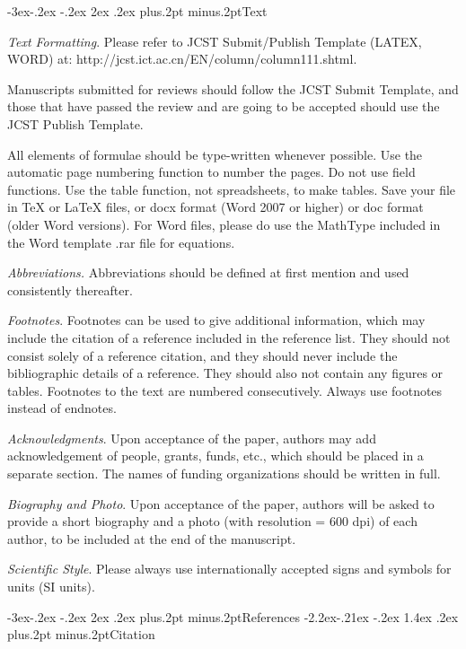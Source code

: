 \documentclass[twoside]{article}
\makeatletter
\def\subsection{\@startsection{subsection}{2}{\z@}%
 {-3ex\@plus -.2ex \@minus -.2ex}%
 {2ex \@plus.2ex}%
{\normalfont\normalsize\protect\baselineskip=12.5pt plus.2pt minus.2pt\bfseries}}
\def\subsubsection{\@startsection{subsubsection}{3}{\z@}%
 {-2.2ex\@plus -.21ex \@minus -.2ex}%
 {1.4ex \@plus.2ex}
{\normalfont\normalsize\protect\baselineskip=12pt plus.2pt minus.2pt\sl}}
\makeatother
\begin{document}
\begin{multicols}{2}
\subsection{Text}

{\it Text Formatting}. Please refer to JCST Submit/Publish Template (LATEX, WORD) at:  http://jc\-st.ict.ac.cn/EN/column/column111.shtml.

Manuscripts submitted for reviews should follow the JCST Submit Template, and those that have passed the review and are going to be accepted should use the JCST Publish Template.

All elements of formulae should be type-written whenever possible. Use the automatic page numbering function to number the pages. Do not use field functions. Use the table function, not spreadsheets, to make tables. Save your file in TeX or LaTeX files, or docx format (Word 2007 or higher) or doc format (older Word versions). For Word files, please do use the MathType included in the Word template .rar file for equations.

{\it Abbreviations.} Abbreviations should be defined at first mention and used consistently thereafter.

{\it Footnotes}. Footnotes can be used to give additional information, which may include the citation of a reference included in the reference list. They should not consist solely of a reference citation, and they should never include the bibliographic details of a reference. They should also not contain any figures or tables. Footnotes to the text are numbered consecutively. Always use footnotes instead of endnotes.

{\it Acknowledgments}. Upon acceptance of the paper, authors may add acknowledgement of people, grants, funds, etc., which should be placed in a separate section. The names of funding organizations should be written in full.

{\it Biography and Photo}. Upon acceptance of the paper, authors will be asked to provide a short biography and a photo (with resolution = 600 dpi) of each author, to be included at the end of the manuscript.

{\it Scientific Style}. Please always use internationally accepted signs and symbols for units (SI units).

\subsection{References}
\subsubsection{Citation}


\end{multicols}
\end{document}

